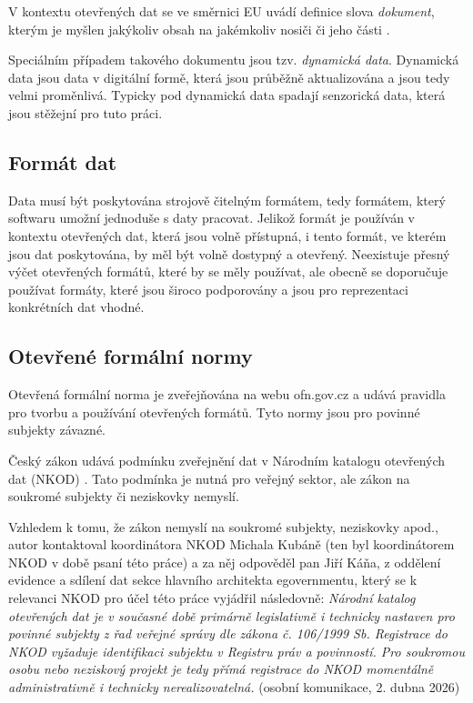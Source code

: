 V kontextu otevřených dat se ve směrnici EU uvádí definice slova \textit{dokument}, kterým je myšlen jakýkoliv obsah na jakémkoliv nosiči či jeho části \parencite[čl. 2 odst. 6]{SmerniceEvropskehoParlamentu2019}. 

Speciálním případem takového dokumentu jsou tzv. \textit{dynamická data}. Dynamická data jsou data v digitální formě, která jsou průběžně aktualizována a jsou tedy velmi proměnlivá. Typicky pod dynamická data spadají senzorická data, která jsou stěžejní pro tuto práci. \parencite[čl. 2 odst. 8]{SmerniceEvropskehoParlamentu2019}

\subsection{Formát dat}
Data musí být poskytována strojově čitelným formátem, tedy formátem, který softwaru umožní jednoduše s daty pracovat. \parencite[čl. 2 odst. 13]{SmerniceEvropskehoParlamentu2019}
Jelikož formát je používán v kontextu otevřených dat, která jsou volně přístupná, i tento formát, ve kterém jsou dat poskytována, by měl být volně dostypný a otevřený. \parencite[čl. 2 odst. 14]{SmerniceEvropskehoParlamentu2019} Neexistuje přesný výčet otevřených formátů, které by se měly používat, ale obecně se doporučuje používat formáty, které jsou široco podporovány a jsou pro reprezentaci konkrétních dat vhodné.

\subsection{Otevřené formální normy}
Otevřená formální norma je zveřejňována na webu ofn.gov.cz a udává pravidla pro tvorbu a používání otevřených formátů. Tyto normy jsou pro povinné subjekty závazné. \parencite{OtevreneFormalniNormy}

Český zákon udává podmínku zveřejnění dat v Národním katalogu otevřených dat (NKOD) \parencite[§ 4c odst. 1]{Zakon1061999}. Tato podmínka je nutná pro veřejný sektor, ale zákon na soukromé subjekty či neziskovky nemyslí.

Vzhledem k tomu, že zákon nemyslí na soukromé subjekty, neziskovky apod., autor kontaktoval koordinátora NKOD Michala Kubáně (ten byl koordinátorem NKOD v době psaní této práce) a za něj odpověděl pan Jiří Káňa, z oddělení evidence a sdílení dat sekce hlavního architekta egovernmentu, který se k relevanci NKOD pro účel této práce vyjádřil následovně: \textit{Národní katalog otevřených dat je v současné době primárně legislativně i technicky nastaven pro povinné subjekty z řad veřejné správy dle zákona č. 106/1999 Sb. Registrace do NKOD vyžaduje identifikaci subjektu v Registru práv a povinností. Pro soukromou osobu nebo neziskový projekt je tedy přímá registrace do NKOD momentálně administrativně i technicky nerealizovatelná.} (osobní komunikace, 2. dubna 2026)

